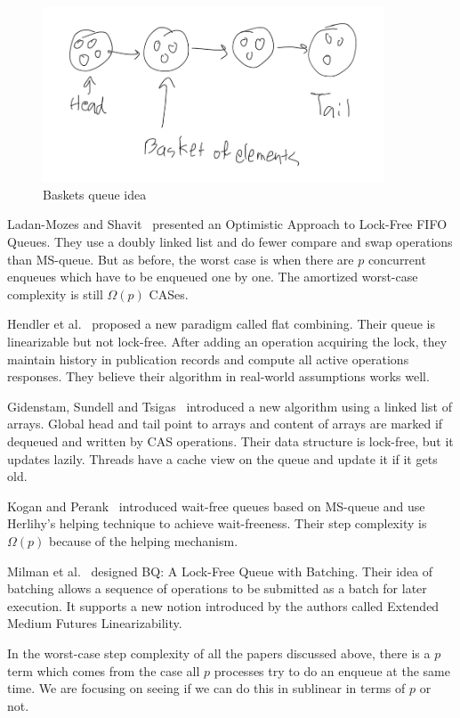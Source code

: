 \documentclass[12pt]{article}
\begin{document}
\begin{figure}[hbt]
  \center\includegraphics[width=4in]{pics/baskets}
  \caption{Baskets queue idea}
\end{figure}

Ladan-Mozes and Shavit~\cite{DBLP:journals/dc/Ladan-MozesS08} presented an Optimistic Approach to Lock-Free FIFO Queues. They use a doubly linked list and do fewer compare and swap operations than MS-queue. But as before, the worst case is when there are $p$ concurrent enqueues which have to be enqueued one by one. The amortized worst-case complexity is still $\Omega(p)$ CASes.

Hendler et al.~\cite{DBLP:conf/spaa/HendlerIST10} proposed a new paradigm called flat combining. Their queue is linearizable but not lock-free. After adding an operation acquiring the lock, they maintain history in publication records and compute all active operations responses. They believe their algorithm in real-world assumptions works well.

Gidenstam, Sundell and Tsigas~\cite{DBLP:conf/opodis/GidenstamST10} introduced a new algorithm using a linked list of arrays. Global head and tail point to arrays and content of arrays are marked if dequeued and written by CAS operations. Their data structure is lock-free, but it updates lazily. Threads have a cache view on the queue and update it if it gets old.

Kogan and Perank~\cite{DBLP:conf/ppopp/KoganP11} introduced wait-free queues based on MS-queue and use Herlihy's helping technique to achieve wait-freeness. Their step complexity is $\Omega(p)$ because of the helping mechanism.

Milman et al.~\cite{DBLP:conf/spaa/MilmanKLLP18} designed BQ: A Lock-Free Queue with Batching. Their idea of batching allows a sequence of operations to be submitted as a batch for later execution. It supports a new notion introduced by the authors called Extended Medium Futures Linearizability.

In the worst-case step complexity of all the papers discussed above, there is a $p$ term which comes from the case all $p$ processes try to do an enqueue at the same time. We are focusing on seeing if we can do this in sublinear in terms of $p$ or not.
\end{document}
